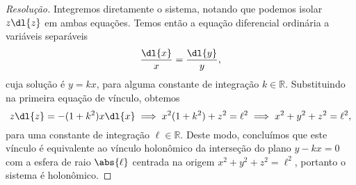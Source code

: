 \begin{proof}[Resolução]
    Integremos diretamente o sistema, notando que podemos isolar \(z \dl{z}\) em ambas equações. Temos então a equação diferencial ordinária a variáveis separáveis
    \begin{equation*}
        \frac{\dl{x}}{x} = \frac{\dl{y}}{y},
    \end{equation*}
    cuja solução é \(y = kx\), para alguma constante de integração \(k \in \mathbb{R}\). Substituindo na primeira equação de vínculo, obtemos
    \begin{equation*}
        z \dl{z} = - (1 + k^2)x \dl{x} \implies x^2(1 + k^2) +  z^2 = \ell^2 \implies x^2 + y^2 + z^2 = \ell^2,
    \end{equation*}
    para uma constante de integração \(\ell \in \mathbb{R}\). Deste modo, concluímos que este vínculo é equivalente ao vínculo holonômico da interseção do plano \(y - kx = 0\) com a esfera de raio \(\abs{\ell}\) centrada na origem \(x^2 + y^2 + z^2 = \ell^2\), portanto o sistema é holonômico.
\end{proof}
